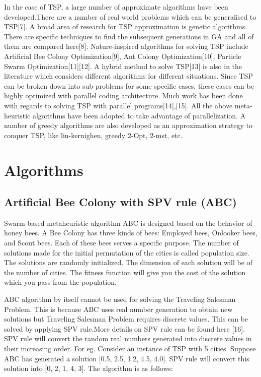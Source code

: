 \documentclass[conference]{IEEEtran}
\begin{document}
In the case of TSP, a large number of approximate algorithms have been developed.There are a number of real world problems which can  be generalised to TSP[7]. A broad area of research for TSP approximation is genetic algorithms. There are specific techniques to find the subsequent generations in GA and all of them are compared here[8]. Nature-inspired algorithms for solving TSP include Artificial Bee Colony Optimization[9], Ant Colony Optimization[10], Particle Swarm Optimization[11][12]. A hybrid method to solve TSP[13] is also in the literature which considers different algorithms for different situations. Since TSP can be broken down into sub-problems for some specific cases, these cases can be highly optimized with parallel coding architecture. Much work has been done with regards to solving TSP with parallel programs[14],[15]. All the above meta-heuristic algorithms have been adopted to take advantage of parallelization. A number of greedy algorithms are also developed as an approximation strategy to conquer TSP, like lin-kernighen, greedy 2-Opt, 2-mst, etc. 


\section{Algorithms}
\subsection {Artificial Bee Colony with SPV rule (ABC)}
Swarm-based metaheuristic algorithm ABC is designed based on the behavior of honey bees. A Bee Colony has three kinds of bees: Employed bees, Onlooker bees, and Scout bees. Each of these bees serves a specific purpose. The number of solutions made for the initial permutation of the cities is called population size. The solutions are randomly initialized. The dimension of each solution will be of the number of cities. The fitness function will give you the cost of the solution which you pass from the population. 

ABC algorithm by itself cannot be used for solving the Traveling Salesman Problem. This is because ABC uses real number generation to obtain new solutions but Traveling Salesman Problem requires discrete values. This can be solved by applying SPV rule.More details on SPV rule can be found here [16]. SPV rule will convert the random real numbers generated into discrete values in their increasing order. For eg. Consider an instance of TSP with 5 cities. Suppose ABC has generated  a solution [0.5, 2.5, 1.2, 4.5, 4.0]. SPV rule will convert this solution into [0, 2, 1, 4, 3].  The algorithm is as follows:
\end{document}
